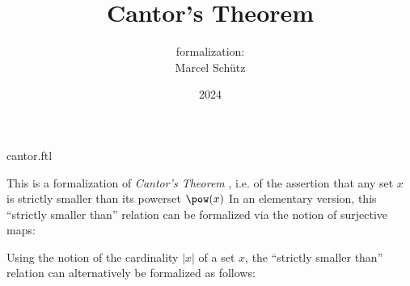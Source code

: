 \documentclass{article}
\title{Cantor's Theorem}
\author{\Naproche formalization: \vspace{0.5em} \\
Marcel Schütz}
\date{2024}
\begin{document}
\begin{smodule}{cantor.ftl}
  \maketitle


  \noindent This is a formalization of \emph{Cantor's Theorem}
  \cite{Cantor1891}, i.e. of the assertion that any set $x$ is strictly smaller
  than its powerset $\pow(x)$
  In an elementary version, this ``strictly smaller than'' relation can be
  formalized via the notion of surjective maps:
  
  \begin{forthel}
  \end{forthel}

  Using the notion of the cardinality $|x|$ of a set $x$, the
  ``strictly smaller than'' relation can alternatively be formalized as follows:

  \begin{forthel}
  \end{forthel}

  \printbibliography
\end{smodule}
\end{document}
